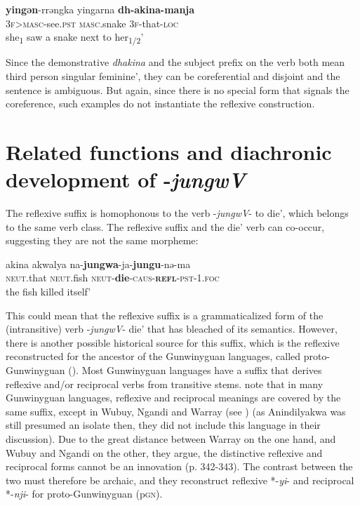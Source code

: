 \documentclass[output=paper]{langscibook}
\begin{document}
\ea%
 \label{ex:vanegmond:30}
\gll \textbf{yingən}-rrəngka yingarna \textbf{dh-akina-manja}\\
 \textsc{3f}>\textsc{masc}-see.\textsc{pst} \textsc{masc}.snake \textsc{3f}-that-\textsc{loc}\\
\glt she\textsubscript{1} saw a snake next to her\textsubscript{1/2}’
\z



Since the demonstrative \textit{dhakina} and the subject prefix on the verb both mean third person singular feminine’, they can be coreferential and disjoint and the sentence is ambiguous. But again, since there is no special form that signals the coreference, such examples do not instantiate the reflexive construction.


\section{Related functions and diachronic development of -\textit{jungwV}}
\label{sec:vanegmond:4}

The reflexive suffix is homophonous to the verb -\textit{jungwV}- to die’, which belongs to the same verb class. The reflexive suffix and the die’ verb can co-occur, suggesting they are not the same morpheme:



\ea%
 \label{ex:vanegmond:31}
\gll akina akwalya na-\textbf{jungwa}{-ja-}\textbf{jungu}-nə-ma\\
\textsc{neut}.that \textsc{neut}.fish \textsc{neut}-\textbf{die}-\textsc{caus}-\textbf{\textsc{refl}}-\textsc{pst}-1.\textsc{foc}\\
\glt the fish killed itself’
\z



{This could mean that the reflexive suffix is a grammaticalized form of the (intransitive) verb -\textit{jungwV}- die’ that has bleached of its semantics.}
{ However, there is another possible historical source for this suffix, which is the reflexive reconstructed for the ancestor of the Gunwinyguan languages, called proto-Gunwinyguan (\citealt{BarryEtAl2003}). Most Gunwinyguan languages have a suffix that derives reflexive and/or reciprocal verbs from transitive stems. \citet[342]{AlpherEtAl2003} note that in many Gunwinyguan languages, reflexive and reciprocal meanings are covered by the same suffix, except in Wubuy, Ngandi and Warray (see ) (as Anindilyakwa was still presumed an isolate then, they did not include this language in their discussion). Due to the great distance between Warray on the one hand, and Wubuy and Ngandi on the other, they argue, the distinctive reflexive and reciprocal forms cannot be an innovation (p. 342-343). The contrast between the two must therefore be archaic, and they reconstruct reflexive *-\textit{yi}- and reciprocal *-\textit{nji}- for proto-Gunwinyguan (p\textsc{gn}).}
\end{document}
